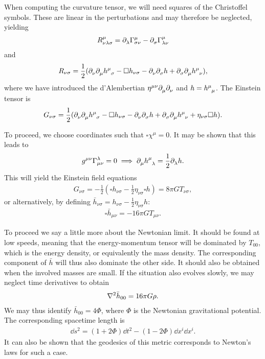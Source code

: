When computing the curvature tensor, we will need squares of the Christoffel symbols. These are linear in the perturbations and may therefore be neglected, yielding
\begin{align*}
	\tensor*{R}{^{\mu}_{\nu\lambda\sigma}} = \del{\lambda}{\chris{\mu}{\sigma}{\nu}} - \del{\sigma}{\chris{\mu}{\lambda}{\nu}}
\end{align*}
and
\begin{align*}
	R_{\nu\sigma} = \frac{1}{2}(\del{\nu}{\del{\mu}{\tensor{h}{^{\mu}_{\sigma}}}} - \square h_{\nu\sigma} - \del{\nu}{\del{\sigma}{h}} + \del{\sigma}{\del{\mu}{\tensor{h}{^{\mu}_{\nu}}}}),
\end{align*}
where we have introduced the d'Alembertian $\eta^{\mu\nu}\partial^{}_{\mu}\partial^{}_{\nu}$ and $h = \tensor{h}{^{\mu}_{\mu}}$. The Einstein tensor is
\begin{align*}
	G_{\nu\sigma} = \frac{1}{2}(\del{\nu}{\del{\mu}{\tensor{h}{^{\mu}_{\sigma}}}} - \square h_{\nu\sigma} - \del{\nu}{\del{\sigma}{h}} + \del{\sigma}{\del{\mu}{\tensor{h}{^{\mu}_{\nu}}}} + \eta_{\nu\sigma}\square h).
\end{align*}

To proceed, we choose coordinates such that $\square\chi^{\mu} = 0$. It may be shown that this leads to
\begin{align*}
	g^{\mu\nu}\chris{\lambda}{\mu}{\nu} = 0 \implies \del{\mu}{\tensor{h}{^{\mu}_{\lambda}}} = \frac{1}{2}\del{\lambda}{h}.
\end{align*}
This will yield the Einstein field equations
\begin{align*}
	G_{\nu\sigma} = -\frac{1}{2}(\square h_{\nu\sigma} - \frac{1}{2}\eta_{\nu\sigma}\square h) = 8\pi GT_{\nu\sigma},
\end{align*}
or alternatively, by defining $\bar{h}_{\nu\sigma} = h_{\nu\sigma} - \frac{1}{2}\eta_{\nu\sigma}h$:
\begin{align*}
	\square\bar{h}_{\mu\nu} = -16\pi GT_{\mu\nu}.
\end{align*}

To proceed we say a little more about the Newtonian limit. It should be found at low speeds, meaning that the energy-momentum tensor will be dominated by $T_{00}$, which is the energy density, or equivalently the mass density. The corresponding component of $\bar{h}$ will thus also dominate the other side. It should also be obtained when the involved masses are small. If the situation also evolves slowly, we may neglect time derivatives to obtain
\begin{align*}
	\laplacian{\bar{h}_{00}} = 16\pi G\rho.
\end{align*}
We may thus identify $\bar{h}_{00} = 4\Phi$, where $\Phi$ is the Newtonian gravitational potential. The corresponding spacetime length is
\begin{align*}
	\dd{s}^{2} = (1 + 2\Phi)\dd{t}^{2} - (1 - 2\Phi)\dd{x^{i}}\dd{x^{i}}.
\end{align*}
It can also be shown that the geodesics of this metric corresponds to Newton's laws for such a case.

